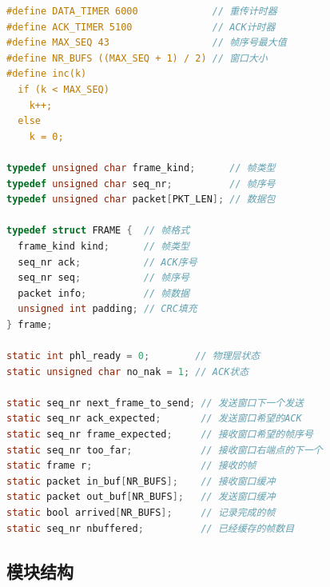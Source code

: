 \begin{lstlisting}[language=C,basicstyle=\tiny\sfmono]
#define DATA_TIMER 6000             // 重传计时器
#define ACK_TIMER 5100              // ACK计时器
#define MAX_SEQ 43                  // 帧序号最大值
#define NR_BUFS ((MAX_SEQ + 1) / 2) // 窗口大小
#define inc(k)                                                                 \
  if (k < MAX_SEQ)                                                             \
    k++;                                                                       \
  else                                                                         \
    k = 0;

typedef unsigned char frame_kind;      // 帧类型
typedef unsigned char seq_nr;          // 帧序号
typedef unsigned char packet[PKT_LEN]; // 数据包

typedef struct FRAME {  // 帧格式
  frame_kind kind;      // 帧类型
  seq_nr ack;           // ACK序号
  seq_nr seq;           // 帧序号
  packet info;          // 帧数据
  unsigned int padding; // CRC填充
} frame;

static int phl_ready = 0;        // 物理层状态
static unsigned char no_nak = 1; // ACK状态

static seq_nr next_frame_to_send; // 发送窗口下一个发送
static seq_nr ack_expected;       // 发送窗口希望的ACK
static seq_nr frame_expected;     // 接收窗口希望的帧序号
static seq_nr too_far;            // 接收窗口右端点的下一个
static frame r;                   // 接收的帧
static packet in_buf[NR_BUFS];    // 接收窗口缓冲
static packet out_buf[NR_BUFS];   // 发送窗口缓冲
static bool arrived[NR_BUFS];     // 记录完成的帧
static seq_nr nbuffered;          // 已经缓存的帧数目
\end{lstlisting}

\subsection{模块结构}

